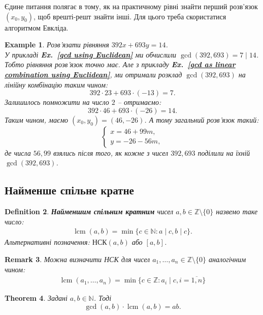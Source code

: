 \documentclass[a4paper, 10pt]{article}
\theoremstyle{theoremdd}
\newtheorem{theorem}{Theorem}[subsection]
\theoremstyle{theoremdd}
\newtheorem{definition}[theorem]{Definition}
\theoremstyle{theoremdd}
\theoremstyle{theoremdd}
\newtheorem{example}[theorem]{Example}
\theoremstyle{theoremdd}
\theoremstyle{theoremdd}
\newtheorem{remark}[theorem]{Remark}
\theoremstyle{theoremdd}
\theoremstyle{theoremdd}
\DeclareMathOperator{\lcm}{lcm}
\newcommand\exref[1]{\textbf{Ex.~\ref{#1}}}
\begin{document}
Єдине питання полягає в тому, як на практичному рівні знайти перший розв'язок $(x_0,y_0)$, щоб врешті-решт знайти інші. Для цього треба скористатися алгоритмом Евкліда.

\begin{example}
Розв'язати рівняння $392x + 693y = 14$.\\
У прикладі \exref{gcd using Euclidean} ми обчислили $\gcd(392,693) = 7 \mid 14$. Тобто рівняння розв'язок точно має. Але з прикладу \exref{gcd as linear combination using Euclidean}, ми отримали розклад $\gcd(392, 693)$ на лінійну комбінацію таким чином:
\[
392 \cdot 23 + 693 \cdot (-13) = 7.
\]
Залишилось помножити на число $2$ -- отримаємо:\\
\[
392 \cdot 46 + 693 \cdot (-26) = 14.
\]
Таким чином, маємо $(x_0,y_0) = (46,-26)$. А тому загальний розв'язок такий:
\[
\begin{cases}
x = 46 + 99m, \\
y = -26 - 56m,
\end{cases} \]
де числа $56,99$ взялись після того, як кожне з чисел $392,693$ поділили на їхній $\gcd(392, 693)$.
\end{example}

\subsection{Найменше спільне кратне}
\begin{definition}
\textbf{Найменшим спільним кратним} чисел $a,b \in \mathbb{Z} \setminus \{0\}$ назвемо таке число:
\begin{align*}
\lcm(a,b) = \min \{c \in \mathbb{N}: a \mid c,b \mid c\}.
\end{align*}
Альтернативні позначення: $\text{НСК}(a,b)$ або $[a,b]$.
\end{definition}

\begin{remark}
Можна визначити НСК для чисел $a_1,\dots,a_n \in \mathbb{Z} \setminus \{0\}$ аналогічним чином:
\begin{align*}
\lcm(a_1,\dots,a_n) = \min\{c \in \mathbb{Z}: a_i \mid c, i = \overline{1,n}\}
\end{align*}
\end{remark}

\begin{theorem}
Задані $a,b \in \mathbb{N}$. Тоді
\begin{equation}
\label{eq:lcm_times_gcd}
\gcd(a,b) \cdot \lcm(a,b) = ab.
\end{equation}
\end{theorem}
\end{document}

